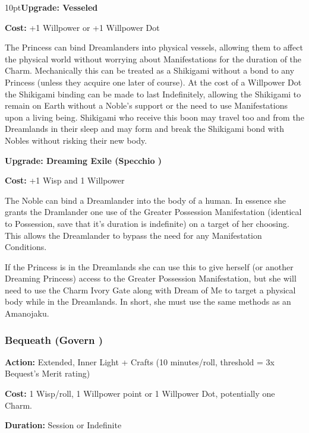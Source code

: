 \begin{myindentpar}{10pt}\textbf{Upgrade: Vesseled}

\noindent \textbf{Cost:} +1 Willpower or +1 Willpower Dot

The Princess can bind Dreamlanders into physical vessels, allowing them to affect the physical world without worrying about Manifestations for the duration of the Charm. Mechanically this can be treated as a Shikigami without a bond to any Princess (unless they acquire one later of course). At the cost of a Willpower Dot the Shikigami binding can be made to last Indefinitely, allowing the Shikigami to remain on Earth without a Noble's support or the need to use Manifestations upon a living being. Shikigami who receive this boon may travel too and from the Dreamlands in their sleep and may form and break the Shikigami bond with Nobles without risking their new body. 

\textbf{Upgrade: Dreaming Exile (Specchio \textbullet\textbullet)}

\textbf{Cost:} +1 Wisp and 1 Willpower

The Noble can bind a Dreamlander into the body of a human. In essence she grants the Dramlander one use of the Greater Possession Manifestation (identical to Possession, save that it's duration is indefinite) on a target of her choosing. This allows the Dreamlander to bypass the need for any Manifestation Conditions. 

If the Princess is in the Dreamlands she can use this to give herself (or another Dreaming Princess) access to the Greater Possession Manifestation, but she will need to use the Charm Ivory Gate along with Dream of Me to target a physical body while in the Dreamlands. In short, she must use the same methods as an Amanojaku.

\end{myindentpar}

\subsubsection*{Bequeath (Govern \textbullet\textbullet\textbullet)}

\noindent \textbf{Action:} Extended, Inner Light + Crafts (10 minutes/roll, threshold = 3x Bequest's Merit rating)

\noindent \textbf{Cost:} 1 Wisp/roll, 1 Willpower point or 1 Willpower Dot, potentially one Charm. 

\noindent \textbf{Duration:} Session or Indefinite \\

